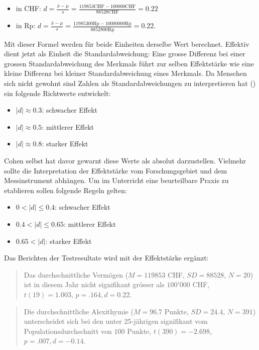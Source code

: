 \documentclass[
]{book}
\providecommand{\tightlist}{%
  \setlength{\itemsep}{0pt}\setlength{\parskip}{0pt}}
\theoremstyle{definition}
\theoremstyle{definition}
\theoremstyle{definition}
\theoremstyle{definition}
\theoremstyle{remark}
\begin{document}
\begin{itemize}
\tightlist
\item
  in CHF: \(d = \frac{\bar{x} - \mu}{s} = \frac{119853 \text{CHF} - 100000 \text{CHF}}{88528\text{CHF}}  = 0.22\)
\item
  in Rp: \(d = \frac{\bar{x} - \mu}{s} = \frac{11985300 \text{Rp} - 10000000 \text{Rp}}{8852800\text{Rp}}  = 0.22 .\)
\end{itemize}

Mit dieser Formel werden für beide Einheiten derselbe Wert berechnet. Effektiv dient jetzt als Einheit die Standardabweichung: Eine grosse Differenz bei einer grossen Standardabweichung des Merkmals führt zur selben Effektstärke wie eine kleine Differenz bei kleiner Standardabweichung eines Merkmals. Da Menschen sich nicht gewohnt sind Zahlen als Standardabweichungen zu interpretieren hat () ein folgende Richtwerte entwickelt:

\begin{itemize}
\tightlist
\item
  \(|d| \approx 0.3\): schwacher Effekt
\item
  \(|d| \approx 0.5\): mittlerer Effekt
\item
  \(|d| \approx 0.8\): starker Effekt
\end{itemize}

Cohen selbst hat davor gewarnt diese Werte als absolut darzustellen. Vielmehr sollte die Interpretation der Effektstärke vom Forschungsgebiet und dem Messinstrument abhängen. Um im Unterricht eine beurteilbare Praxis zu etablieren sollen folgende Regeln gelten:

\begin{itemize}
\tightlist
\item
  \(0 < |d| \leq 0.4\): schwacher Effekt
\item
  \(0.4 < |d| \leq 0.65\): mittlerer Effekt
\item
  \(0.65 < |d|\): starker Effekt
\end{itemize}

Das Berichten der Testresultate wird mit der Effektstärke ergänzt:

\begin{quote}
Das durchschnittliche Vermögen (\(M = 119853\) CHF, \(SD = 88528\), \(N = 20\)) ist in diesem Jahr nicht signifikant grösser als \(100'000\) CHF, \(t(19) = 1.003\), \(p = .164, d = 0.22\).
\end{quote}

\begin{quote}
Die durchschnittliche Alexithymie (\(M = 96.7\) Punkte, \(SD = 24.4\), \(N = 391\)) unterscheidet sich bei den unter 25-jährigen signifikant vom Populationsdurchschnitt von \(100\) Punkte, \(t(390) = -2.698\), \(p = .007, d = -0.14\).
\end{quote}
\end{document}
